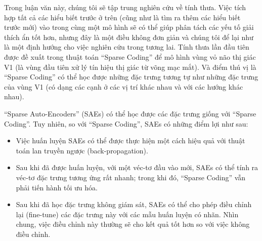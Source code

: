 Trong luận văn này, chúng tôi sẽ tập trung nghiên cứu về tính thưa. Việc tích hợp tất cả các hiểu biết trước ở trên (cũng như là tìm ra thêm các hiểu biết trước mới) vào trong cùng một mô hình sẽ có thể giúp phân tách các yếu tố giải thích ẩn tốt hơn, nhưng đây là một điều không đơn giản và chúng tôi để lại như là một định hướng cho việc nghiên cứu trong tương lai. Tính thưa lần đầu tiên được đề xuất trong thuật toán ``Sparse Coding'' \cite{olshausen1996emergence} để mô hình vùng vỏ não thị giác V1 (là vùng đầu tiên xử lý tín hiệu thị giác từ võng mạc mắt). Và điểm thú vị là ``Sparse Coding'' có thể học được những đặc trưng tương tự như những đặc trưng của vùng V1 (có dạng các cạnh ở các vị trí khác nhau và với các hướng khác nhau).

``Sparse Auto-Encoders'' (SAEs) có thể học được các đặc trưng giống với ``Sparse Coding''. Tuy nhiên, so với ``Sparse Coding'', SAEs có những điểm lợi như sau:
\begin{itemize}
	\item Việc huấn luyện SAEs có thể được thực hiện một cách hiệu quả với thuật toán lan truyền ngược (back-propagation).
	\item Sau khi đã được huấn luyện, với một véc-tơ đầu vào mới, SAEs có thể tính ra véc-tơ đặc trưng tương ứng rất nhanh; trong khi đó, ``Sparse Coding'' vẫn phải tiến hành tối ưu hóa.
	\item Sau khi đã học đặc trưng không giám sát, SAEs có thể cho phép điều chỉnh lại (fine-tune) các đặc trưng này với các mẫu huấn luyện có nhãn. Nhìn chung, việc điều chỉnh này thường sẽ cho kết quả tốt hơn so với việc không điều chỉnh.
\end{itemize}

